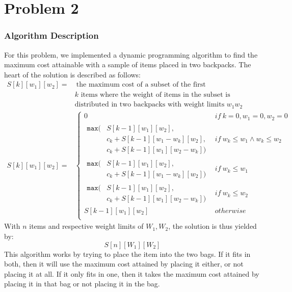 \documentclass{math}
\begin{document}
\section*{Problem 2}

\subsubsection*{Algorithm Description}
For this problem, we implemented a dynamic programming algorithm to find the
maximum cost attainable with a sample of items placed in two backpacks. The
heart of the solution is described as follows:
\begin{align*}
  S[k][w_1][w_2] =& ~\text{the maximum cost of a subset of the first } \\
  & k \text{ items where the weight of items in the subset is} \\
  & \text{distributed in two backpacks with weight limits } w_1w_2 \\[3em]
  S[k][w_1][w_2] =& \begin{cases}
    0 & if~k = 0, w_1 = 0, w_2 = 0 \\[1em]
    \begin{aligned}
      \texttt{max}(&S[k-1][w_1][w_2], \\
      & c_k+S[k-1][w_1-w_k][w_2], \\
      & c_k+S[k-1][w_1][w_2-w_k])
    \end{aligned} & if~w_k\le w_1\wedge w_k\le w_2 \\[2em]
    \begin{aligned}
      \texttt{max}(&S[k-1][w_1][w_2], \\
      & c_k+S[k-1][w_1-w_k][w_2])
    \end{aligned} & if~w_k\le w_1 \\[2em]
    \begin{aligned}
      \texttt{max}(&S[k-1][w_1][w_2], \\
      & c_k+S[k-1][w_1][w_2-w_k])
    \end{aligned} & if~w_k\le w_2 \\[2em]
    S[k-1][w_1][w_2] & otherwise \\
  \end{cases}
\end{align*}
With \( n \) items and respective weight limits of \( W_1,W_2 \), the solution
is thus yielded by:
\[ S[n][W_1][W_2] \]
This algorithm works by trying to place the item into the two bags. If it fits
in both, then it will use the maximum cost attained by placing it either, or
not placing it at all. If it only fits in one, then it takes the maximum cost
attained by placing it in that bag or not placing it in the bag.
\end{document}
